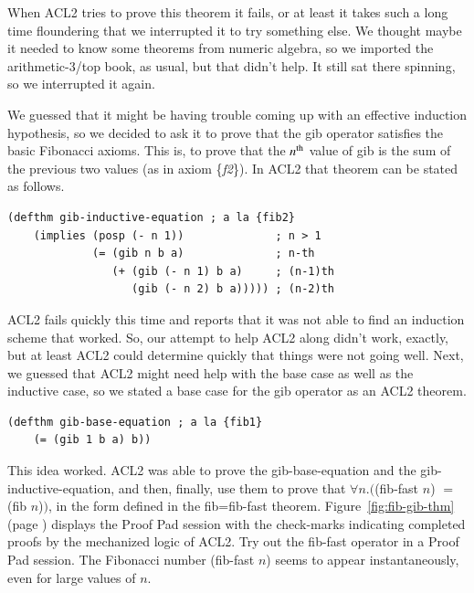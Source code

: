 When ACL2 tries to prove this theorem it fails,
or at least it takes such a long time floundering that we interrupted it
to try something else.
We thought maybe it needed to know some theorems from numeric
algebra, so we imported the arithmetic-3/top book, as usual,
but that didn't help. It still sat there spinning,
so we interrupted it again.

We guessed that it might be having trouble coming up with an effective
induction hypothesis, so we decided to ask it to prove that
the \textsf{gib} operator satisfies the basic Fibonacci axioms.
This is, to prove that the $n^\textnormal{th}$ value of \textsf{gib} is
the sum of the previous two values (as in axiom \{\emph{f2}\}).
In ACL2 that theorem can be stated as follows.
\begin{center}
\begin{code}
\begin{verbatim}
(defthm gib-inductive-equation ; a la {fib2}
    (implies (posp (- n 1))              ; n > 1
             (= (gib n b a)              ; n-th
                (+ (gib (- n 1) b a)     ; (n-1)th
                   (gib (- n 2) b a))))) ; (n-2)th
\end{verbatim}
\end{code}
\end{center}

ACL2 fails quickly this time and reports that it was not able
to find an induction scheme that worked.
So, our attempt to help ACL2 along didn't work, exactly, %
but at least ACL2 could determine quickly that
things were not going well.
Next, we guessed that ACL2 might need help with the
base case as well as the inductive case, so we
stated a base case for the \textsf{gib} operator as an ACL2 theorem.
\begin{center}
\begin{code}
\begin{verbatim}
(defthm gib-base-equation ; a la {fib1}
    (= (gib 1 b a) b))
\end{verbatim}
\end{code}
\end{center}

This idea worked. ACL2 was able to prove the gib-base-equation
and the gib-inductive-equation, and then, finally,
use them to prove that $\forall n.($\textsf{(fib-fast $n$)} $=$ \textsf{(fib $n$)}$)$,
in the form defined in the \textsf{fib=fib-fast} theorem.
Figure~\ref{fig:fib-gib-thm} (page \pageref{fig:fib-gib-thm})
displays the Proof Pad session with the check-marks
indicating completed proofs by the mechanized logic of ACL2.
Try out the \textsf{fib-fast} operator in a Proof Pad session.
The Fibonacci number \textsf{(fib-fast $n$)} seems to appear
instantaneously, even for large values of $n$.

